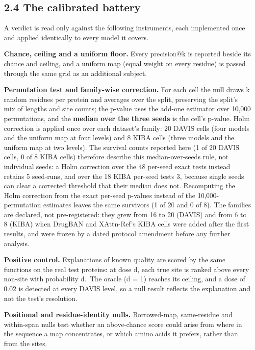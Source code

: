 \documentclass[
  11pt,
]{article}
\begin{document}
\subsection{2.4 The calibrated battery}\label{the-calibrated-battery}

A verdict is read only against the following instruments, each implemented once and applied identically to every model it covers.

\textbf{Chance, ceiling and a uniform floor.} Every precision@k is reported beside its chance and ceiling, and a uniform map (equal weight on every residue) is passed through the same grid as an additional subject.

\textbf{Permutation test and family-wise correction.} For each cell the null draws k random residues per protein and averages over the split, preserving the split's mix of lengths and site counts; the p-value uses the add-one estimator over 10,000 permutations, and the \textbf{median over the three seeds} is the cell's p-value. Holm correction \citep{Holm1979} is applied once over each dataset's family: 20 DAVIS cells (four models and the uniform map at four levels) and 8 KIBA cells (three models and the uniform map at two levels). The survival counts reported here (1 of 20 DAVIS cells, 0 of 8 KIBA cells) therefore describe this median-over-seeds rule, not individual seeds: a Holm correction over the 48 per-seed exact tests instead retains 5 seed-runs, and over the 18 KIBA per-seed tests 3, because single seeds can clear a corrected threshold that their median does not. Recomputing the Holm correction from the exact per-seed p-values instead of the 10,000-permutation estimates leaves the same survivors (1 of 20 and 0 of 8). The families are declared, not pre-registered: they grew from 16 to 20 (DAVIS) and from 6 to 8 (KIBA) when DrugBAN and XAttn-Ref's KIBA cells were added after the first results, and were frozen by a dated protocol amendment before any further analysis.

\textbf{Positive control.} Explanations of known quality are scored by the same functions on the real test proteins: at dose d, each true site is ranked above every non-site with probability d.~The oracle (d = 1) reaches its ceiling, and a dose of 0.02 is detected at every DAVIS level, so a null result reflects the explanation and not the test's resolution.

\textbf{Positional and residue-identity nulls.} Borrowed-map, same-residue and within-span nulls test whether an above-chance score could arise from where in the sequence a map concentrates, or which amino acids it prefers, rather than from the sites.
\end{document}
